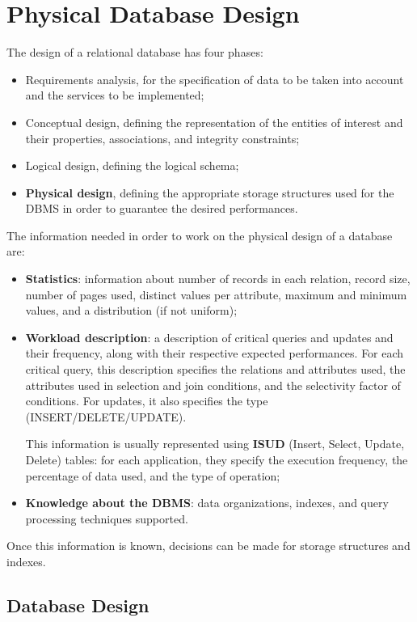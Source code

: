 \chapter{Physical Database Design}

The design of a relational database has four phases:
\begin{itemize}
    \item Requirements analysis, for the specification of data to be taken into account and the services to be implemented;
    \item Conceptual design, defining the representation of the entities of interest and their properties, associations, and integrity constraints;
    \item Logical design, defining the logical schema;
    \item \textbf{Physical design}, defining the appropriate storage structures used for the DBMS in order to guarantee the desired performances.
\end{itemize}
The information needed in order to work on the physical design of a database are:
\begin{itemize}
    \item \textbf{Statistics}: information about number of records in each relation, record size, number of pages used, distinct values per attribute, maximum and minimum values, and a distribution (if not uniform);
    \item \textbf{Workload description}: a description of critical queries and updates and their frequency, along with their respective expected performances. 
    For each critical query, this description specifies the relations and attributes used, the attributes used in selection and join conditions, and the selectivity factor of conditions. For updates, it also specifies the type (INSERT/DELETE/UPDATE).
    
    This information is usually represented using \textbf{ISUD} (Insert, Select, Update, Delete) tables: for each application, they specify the execution frequency, the percentage of data used, and the type of operation;
    \item \textbf{Knowledge about the DBMS}: data organizations, indexes, and query processing techniques supported.
\end{itemize}
Once this information is known, decisions can be made for storage structures and indexes.

\section{Database Design}

